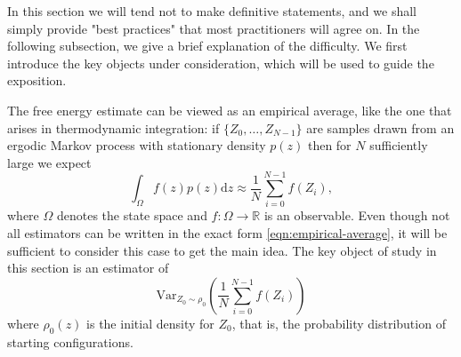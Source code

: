 \documentclass[9pt,bestpractices]{livecoms}
\begin{document}
In this section we will tend not to make definitive statements, and we shall simply provide "best practices" that most practitioners will agree on. In the following subsection, we give a brief explanation of the difficulty. We first introduce the key objects under consideration, which will be used to guide the exposition.

The free energy estimate can be viewed as an empirical average, like the one that arises in thermodynamic integration: if $\{Z_0, \dots, Z_{N-1}\}$ are samples drawn from an ergodic Markov process with stationary density $p(z)$ then for $N$ sufficiently large we expect 
\begin{equation}
    \int_\Omega f(z) p(z) \mathrm{d}z\approx \frac{1}{N}\sum_{i=0}^{N-1} f(Z_i), \label{eqn:empirical-average}
\end{equation}
where $\Omega$ denotes the state space and $f : \Omega \rightarrow \mathbb{R}$ is an observable. Even though not all estimators can be written in the exact form \eqref{eqn:empirical-average}, it will be sufficient to consider this case to get the main idea. The key object of study in this section is an estimator of 
\begin{equation}
    \mathrm{Var}_{Z_0 \sim \rho_0}\left(\frac{1}{N}\sum_{i=0}^{N-1} f(Z_i)\right)
\end{equation}
where $\rho_0(z)$ is the initial density for $Z_0$, that is, the probability distribution of starting configurations.

%
%
%
\end{document}
